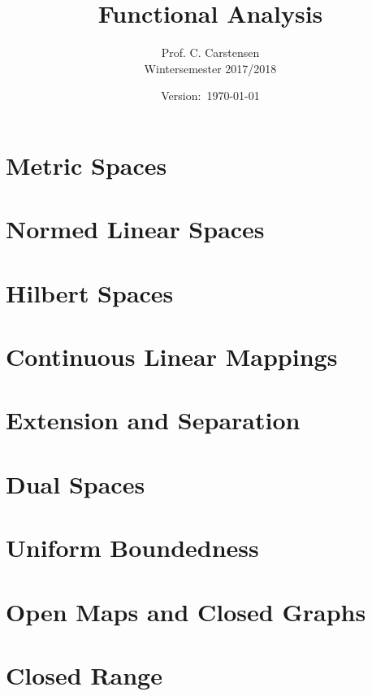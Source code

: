 \documentclass[draft=false]{scrreprt}
\title{Functional Analysis}
\author{Prof. C. Carstensen\\
Wintersemester 2017/2018}
\date{Version:~\today}
\begin{document}
\maketitle
\thispagestyle{empty}
\cleardoublepage

\tableofcontents
\cleardoublepage



\chapter{Metric Spaces}


\chapter{Normed Linear Spaces}


\chapter{Hilbert Spaces}


\chapter{Continuous Linear Mappings}


\chapter{Extension and Separation}


\chapter{Dual Spaces}


\chapter{Uniform Boundedness}


\chapter{Open Maps and Closed Graphs}


\chapter{Closed Range}

\end{document}
